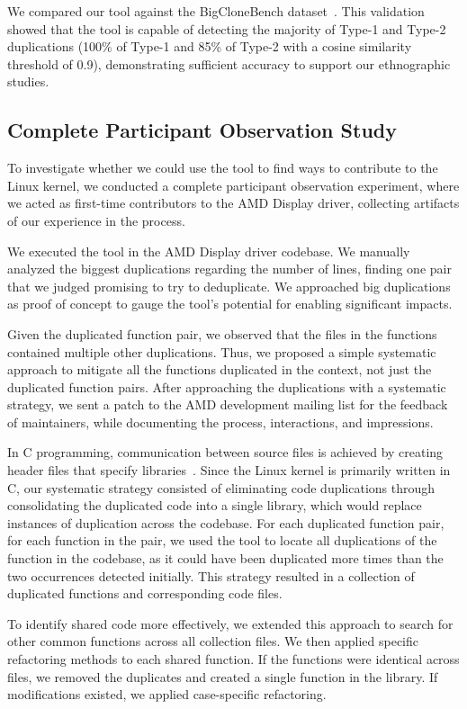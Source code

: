 \documentclass[10pt,conference]{IEEEtran}
\begin{document}
We compared our tool against the BigCloneBench dataset~\cite{bigclonebench}. This validation showed that the tool is capable of detecting the majority of Type-1 and Type-2 duplications (100\% of Type-1 and 85\% of Type-2 with a cosine similarity threshold of 0.9), demonstrating sufficient accuracy to support our ethnographic studies.

\subsection{Complete Participant Observation Study}
\label{sec:participant}

To investigate whether we could use the tool to find ways to contribute to the Linux kernel, we conducted a complete participant observation experiment, where we acted as first-time contributors to the AMD Display driver, collecting artifacts of our experience in the process.

We executed the tool in the AMD Display driver codebase. We manually analyzed the biggest duplications regarding the number of lines, finding one pair that we judged promising to try to deduplicate. We approached big duplications as proof of concept to gauge the tool's potential for enabling significant impacts.

Given the duplicated function pair, we observed that the files in the functions contained multiple other duplications. Thus, we proposed a simple systematic approach to mitigate all the functions duplicated in the context, not just the duplicated function pairs. After approaching the duplications with a systematic strategy, we sent a patch to the AMD development mailing list for the feedback of maintainers, while documenting the process, interactions, and impressions.

In C programming, communication between source files is achieved by creating header files that specify libraries~\cite{Cbook}. Since the Linux kernel is primarily written in C, our systematic strategy consisted of eliminating code duplications through consolidating the duplicated code into a single library, which would replace instances of duplication across the codebase. For each duplicated function pair, for each function in the pair, we used the tool to locate all duplications of the function in the codebase, as it could have been duplicated more times than the two occurrences detected initially. This strategy resulted in a collection of duplicated functions and corresponding code files.

To identify shared code more effectively, we extended this approach to search for other common functions across all collection files. We then applied specific refactoring methods to each shared function. If the functions were identical across files, we removed the duplicates and created a single function in the library. If modifications existed, we applied case-specific refactoring.
\end{document}
